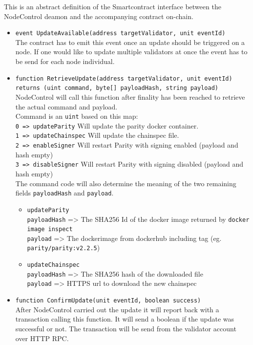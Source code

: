 This is an abstract definition of the Smartcontract interface between the NodeControl deamon and the accompanying contract on-chain.

\begin{itemize}

    \item \texttt{event UpdateAvailable(address targetValidator, unit eventId)} \\
    The contract has to emit this event once an update should be triggered on a node. If one would like to update multiple validators at once the event has to be send for each node individual.

    \item \texttt{function RetrieveUpdate(address targetValidator, unit eventId)} \\ \texttt{returns (uint command, byte[] payloadHash, string payload)} \\  
    NodeControl will call this function after finality has been reached to retrieve the actual command and payload. \\
    Command is an \texttt{uint} based on this map: \\
    \texttt{0 => updateParity} Will update the parity docker container. \\
    \texttt{1 => updateChainspec} Will update the chainspec file. \\
    \texttt{2 => enableSigner} Will restart Parity with signing enabled (payload and hash empty) \\
    \texttt{3 => disableSigner} Will restart Parity with signing disabled (payload and hash empty) \\

    The command code will also determine the meaning of the two remaining fields \texttt{payloadHash} and \texttt{payload}.

    \begin{itemize}
        \item \texttt{updateParity} \\
        \texttt{payloadHash} => The SHA256 Id of the docker image returned by \texttt{docker image inspect} \\
        \texttt{payload} => The dockerimage from dockerhub including tag (eg. \texttt{parity/parity:v2.2.5})

        \item \texttt{updateChainspec} \\
        \texttt{payloadHash} => The SHA256 hash of the downloaded file \\
        \texttt{payload} => HTTPS url to download the new chainspec 

    \end{itemize}
    
    \item \texttt{function ConfirmUpdate(unit eventId, boolean success)} \\
    After NodeControl carried out the update it will report back with a transaction calling this function. It will send a boolean if the update was successful or not. The transaction will be send from the validator account over HTTP RPC.

\end{itemize}
